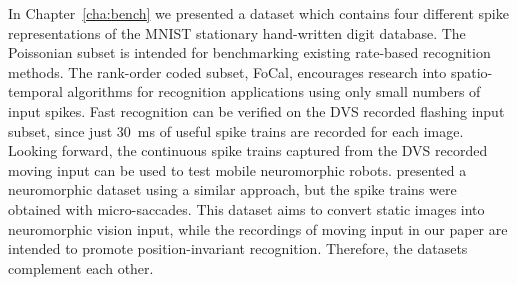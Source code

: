 %
In Chapter~\ref{cha:bench} we presented a dataset which contains four different spike representations of the MNIST stationary hand-written digit database. %
The Poissonian subset is intended for benchmarking existing rate-based recognition methods.
The rank-order coded subset, FoCal, encourages research into spatio-temporal algorithms for recognition applications using only small numbers of input spikes.
Fast recognition can be verified on the DVS recorded flashing input subset, since just 30~ms of useful spike trains are recorded for each image.
Looking forward, the continuous spike trains captured from the DVS recorded moving input can be used to test mobile neuromorphic robots.
\citet{orchard2015convert} presented a neuromorphic dataset using a similar approach, but the spike trains were obtained with micro-saccades.
This dataset aims to convert static images into neuromorphic vision input, while the recordings of moving input in our paper are intended to promote position-invariant recognition.
Therefore, the datasets complement each other.


